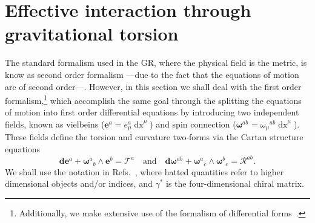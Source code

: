 \documentclass{ws-mpla}
\newcommand{\df}[1][]{\mathbf{d}{#1}}
\newcommand{\ga}{\gamma}
\newcommand{\we}{{\scriptstyle\wedge}}
\newcommand\vi[2]{e^{{#1}}_{{#2}}}
\newcommand\vif[1]{\boldsymbol{e}^{{#1}}}
\newcommand\spi[1]{\omega_{{#1}}}
\newcommand\spif[2]{{\boldsymbol{\omega}}^{{#1}}{}_{{#2}}}
\newcommand{\Rif}[2]{\boldsymbol{\mathcal{R}}^{{#1}}{}_{{#2}}}
\newcommand{\Tf}[1]{\boldsymbol{\mathcal{T}}^{#1}}
\renewcommand{\(}{\left(}
\renewcommand{\)}{\right)}
\renewcommand{\[}{\left[}
\renewcommand{\]}{\right]}
\newcommand*{\de}[1]{\mathop{\mathrm{d}#1}\nolimits}
\begin{document}
\section{Effective interaction through gravitational torsion}\label{CEG}

The standard formalism used in the GR, where the physical field is the metric, is know as second order formalism ---due to the fact that the equations of motion are of second order---. However, in this section we shall deal with the first order formalism,\footnote{Additionally, we make extensive use of the formalism of differential forms~\cite{Cartan-calc,Zanelli:2005sa}.} which accomplish the same goal through the splitting the equations of motion into first order differential equations  by introducing two independent fields, known as vielbeins \mbox{($\vif{a} = \vi{a}{\mu}\de{x}^\mu$)} and spin connection \mbox{($\spif{ab}{} = \spi{\mu}{}^{ab}\de{x}^\mu$).} These fields define the torsion and curvature two-forms via the Cartan structure equations
\begin{equation}
  \df[\vif{a}] + \spif{a}{b} \we \vif{b} = \Tf{a} \quad \text{and} \quad \df[\spif{ab}{}] + \spif{a}{c} \we \spif{b}{c} = \Rif{ab}{}.
\end{equation}
We shall use the notation in Refs.~, where hatted quantities refer to higher dimensional objects and/or indices, and $\ga^{*}$ is the four-dimensional chiral matrix.
\end{document}
